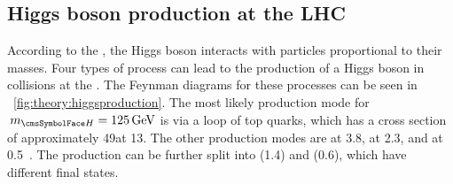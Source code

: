 \subsection{Higgs boson production at the LHC}
\label{sec:th:higgs_production_modes}

According to the \SM, the Higgs boson interacts with particles proportional to their masses. Four types of process can lead to the production of a Higgs boson in \pp collisions at the \LHC. The Feynman diagrams for these processes can be seen in \Fig~\ref{fig:theory:higgsproduction}. The most likely production mode for $\mH=125\GeV$ is \ggH via a loop of top quarks, which has a cross section of approximately 49\pb at 13\TeV. The other production modes are \VBF at 3.8\pb, \VH at 2.3\pb, and \ttH at 0.5\pb~\cite{LHCHXSWGYR4}. The \VH production can be further split into \WH (1.4\pb) and \ZH (0.6\pb), which have different final states.

